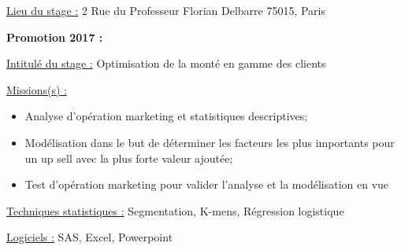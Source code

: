 \documentclass[
  letterpaper,
  DIV=11,
  numbers=noendperiod]{scrreprt}
\begin{document}
\uline{Lieu du stage :} 2 Rue du Professeur Florian Delbarre 75015,
Paris

\textbf{Promotion 2017 :}

\uline{Intitulé du stage :} Optimisation de la monté en gamme des
clients

\uline{Missions(s) :}

\begin{itemize}
\item
  Analyse d'opération marketing et statistiques descriptives;
\item
  Modélisation dans le but de déterminer les facteurs les plus
  importants pour un up sell avec la plus forte valeur ajoutée;
\item
  Test d'opération marketing pour valider l'analyse et la modélisation
  en vue
\end{itemize}

\uline{Techniques statistiques :} Segmentation, K-mens, Régression
logistique

\uline{Logiciels :} SAS, Excel, Powerpoint
\end{document}
